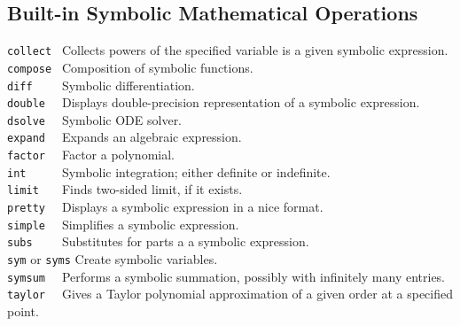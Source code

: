 \subsection*{Built-in Symbolic Mathematical Operations}
\verb&collect & Collects powers of the specified variable is a given symbolic expression.\\
\verb&compose & Composition of symbolic functions.\\
\verb&diff    & Symbolic differentiation.\\
\verb&double  & Displays double-precision representation of a symbolic expression.\\
\verb&dsolve  & Symbolic ODE solver.\\
\verb&expand  & Expands an algebraic expression.\\
\verb&factor  & Factor a polynomial.\\
\verb&int     & Symbolic integration; either definite or indefinite.\\
\verb&limit   & Finds two-sided limit, if it exists.\\
\verb&pretty  & Displays a symbolic expression in a nice format.\\
\verb&simple  & Simplifies a symbolic expression.\\
\verb&subs    & Substitutes for parts a a symbolic expression.\\
\verb&sym& or \verb&syms& Create symbolic variables.\\
\verb&symsum  & Performs a symbolic summation, possibly with infinitely many entries.\\
\verb&taylor  & Gives a Taylor polynomial approximation of a given order at a specified point.\\





